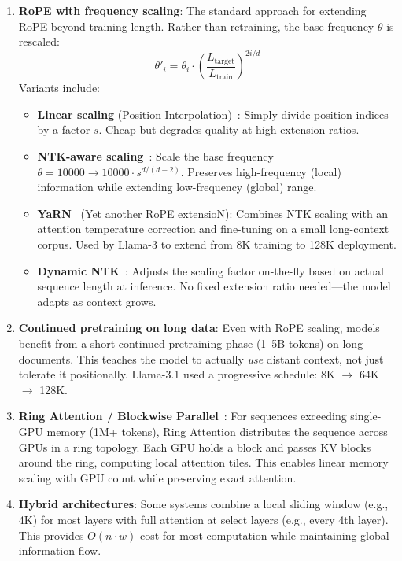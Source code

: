 \begin{enumerate}
  \item \textbf{RoPE with frequency scaling}: The standard approach for extending RoPE beyond training length. Rather than retraining, the base frequency $\theta$ is rescaled: 
\[
\theta'_i = \theta_i \cdot \left(\frac{L_{\text{target}}}{L_{\text{train}}}\right)^{2i/d}
\]
 Variants include:

\begin{itemize}
  \item \textbf{Linear scaling} (Position Interpolation)~\cite{chen2023extending}: Simply divide position indices by a factor $s$. Cheap but degrades quality at high extension ratios.
  \item \textbf{NTK-aware scaling}~\cite{peng2023yarn}: Scale the base frequency $\theta = 10000 \to 10000 \cdot s^{d/(d-2)}$. Preserves high-frequency (local) information while extending low-frequency (global) range.
  \item \textbf{YaRN}~\cite{peng2023yarn} (Yet another RoPE extensioN): Combines NTK scaling with an attention temperature correction and fine-tuning on a small long-context corpus. Used by Llama-3 to extend from 8K training to 128K deployment.
  \item \textbf{Dynamic NTK}~\cite{peng2023yarn}: Adjusts the scaling factor on-the-fly based on actual sequence length at inference. No fixed extension ratio needed---the model adapts as context grows.
\end{itemize}
  \item \textbf{Continued pretraining on long data}: Even with RoPE scaling, models benefit from a short continued pretraining phase (1--5B tokens) on long documents. This teaches the model to actually \emph{use} distant context, not just tolerate it positionally. Llama-3.1 used a progressive schedule: 8K $\to$ 64K $\to$ 128K.
  \item \textbf{Ring Attention / Blockwise Parallel}~\cite{liu2023ringattention}: For sequences exceeding single-GPU memory (1M+ tokens), Ring Attention distributes the sequence across GPUs in a ring topology. Each GPU holds a block and passes KV blocks around the ring, computing local attention tiles. This enables linear memory scaling with GPU count while preserving exact attention.
  \item \textbf{Hybrid architectures}: Some systems combine a local sliding window (e.g., 4K) for most layers with full attention at select layers (e.g., every 4th layer). This provides $O(n \cdot w)$ cost for most computation while maintaining global information flow.
\end{enumerate}

